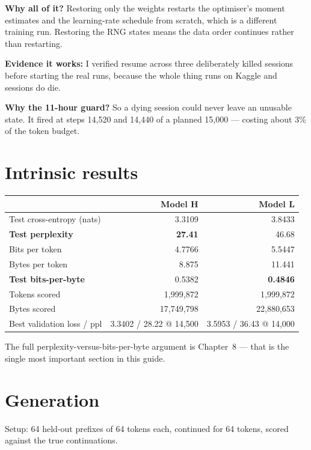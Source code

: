 \documentclass[11pt]{report}
\begin{document}
\begin{deeper}
\textbf{Why all of it?} Restoring only the weights restarts the optimiser's
moment estimates and the learning-rate schedule from scratch, which is a
different training run. Restoring the RNG states means the data order continues
rather than restarting.

\medskip
\textbf{Evidence it works:} I verified resume across three deliberately killed
sessions before starting the real runs, because the whole thing runs on Kaggle
and sessions do die.

\medskip
\textbf{Why the 11-hour guard?} So a dying session could never leave an unusable
state. It fired at steps 14,520 and 14,440 of a planned 15,000 --- costing about
3\% of the token budget.
\end{deeper}

\section{Intrinsic results}

\begin{center}\small
\begin{tabular}{lrr}
\toprule
& \textbf{Model H} & \textbf{Model L} \\
\midrule
Test cross-entropy (nats) & 3.3109 & 3.8433 \\
\textbf{Test perplexity} & \textbf{27.41} & 46.68 \\
Bits per token & 4.7766 & 5.5447 \\
Bytes per token & 8.875 & 11.441 \\
\textbf{Test bits-per-byte} & 0.5382 & \textbf{0.4846} \\
Tokens scored & 1,999,872 & 1,999,872 \\
Bytes scored & 17,749,798 & 22,880,653 \\
Best validation loss / ppl & 3.3402 / 28.22 @ 14,500 & 3.5953 / 36.43 @ 14,000 \\
\bottomrule
\end{tabular}
\end{center}

The full perplexity-versus-bits-per-byte argument is Chapter~8 --- that is the
single most important section in this guide.

\section{Generation}

Setup: 64 held-out prefixes of 64 tokens each, continued for 64 tokens, scored
against the true continuations.
\end{document}
